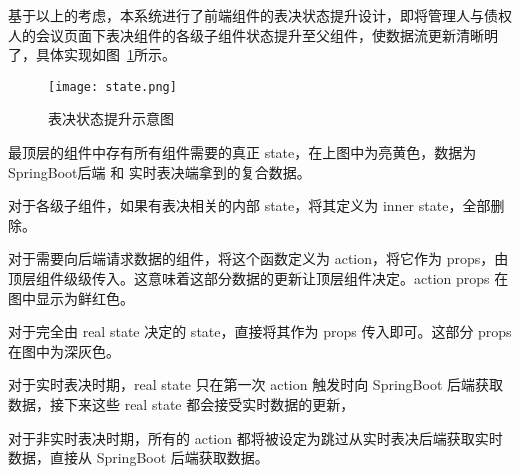   基于以上的考虑，本系统进行了前端组件的表决状态提升设计，即将管理人与债权人的会议页面下表决组件的各级子组件状态提升至父组件，使数据流更新清晰明了，具体实现如图~\ref{fig:state}所示。

  \begin{figure}[!htp]
    \centering
    \texttt{[image: state.png]}
    \caption{表决状态提升示意图}
   \label{fig:state}
  \end{figure}

  最顶层的组件中存有所有组件需要的真正 state，在上图中为亮黄色，数据为 SpringBoot后端 和 实时表决端拿到的复合数据。

  对于各级子组件，如果有表决相关的内部 state，将其定义为 inner state，全部删除。

  对于需要向后端请求数据的组件，将这个函数定义为 action，将它作为 props，由顶层组件级级传入。这意味着这部分数据的更新让顶层组件决定。action props 在图中显示为鲜红色。

  对于完全由 real state 决定的 state，直接将其作为 props 传入即可。这部分 props 在图中为深灰色。

对于实时表决时期，real state 只在第一次 action 触发时向 SpringBoot 后端获取数据，接下来这些 real state 都会接受实时数据的更新，

对于非实时表决时期，所有的 action 都将被设定为跳过从实时表决后端获取实时数据，直接从 SpringBoot 后端获取数据。
